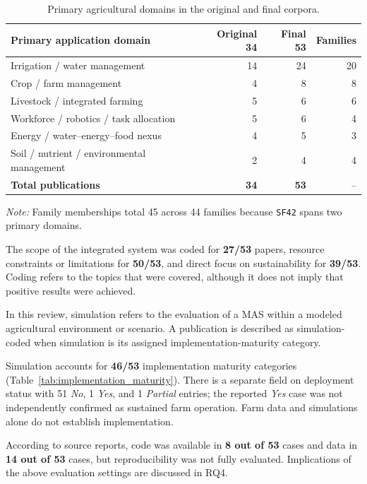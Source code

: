 \documentclass[11pt,a4paper]{article}
\begin{document}
\begin{table}[H]
\centering
\small
\caption{Primary agricultural domains in the original and final corpora.}
\label{tab:application_domains}
\begin{tabularx}{\textwidth}{@{}Xrrr@{}}
\toprule
\textbf{Primary application domain} &
\textbf{Original 34} &
\textbf{Final 53} &
\textbf{Families} \\
\midrule
Irrigation / water management & 14 & 24 & 20 \\
Crop / farm management & 4 & 8 & 8 \\
Livestock / integrated farming & 5 & 6 & 6 \\
Workforce / robotics / task allocation & 5 & 6 & 4 \\
Energy / water--energy--food nexus & 4 & 5 & 3 \\
Soil / nutrient / environmental management & 2 & 4 & 4 \\
\midrule
\textbf{Total publications} & \textbf{34} & \textbf{53} & -- \\
\bottomrule
\end{tabularx}
\par\smallskip
\footnotesize\emph{Note:} Family memberships total 45 across 44
families because \texttt{SF42} spans two primary domains.
\end{table}

The scope of the integrated system was coded for \textbf{27/53} papers, resource constraints or limitations for \textbf{50/53}, and direct focus on sustainability for \textbf{39/53}. Coding refers to the topics that were covered, although it does not imply that positive results were achieved. 

In this review, simulation refers to the evaluation of a MAS within a modeled agricultural environment or scenario. A publication is described as simulation-coded when simulation is its assigned implementation-maturity category.


Simulation accounts for \textbf{46/53} implementation maturity categories (Table~\ref{tab:implementation_maturity}). There is a separate field on deployment status with 51 \emph{No}, 1 \emph{Yes}, and 1 \emph{Partial} entries; the reported \emph{Yes} case was not independently confirmed as sustained farm operation. Farm data and simulations alone do not establish implementation.

According to source reports, code was available in \textbf{8 out of 53}
cases and data in \textbf{14 out of 53} cases, but reproducibility was
not fully evaluated. Implications of the above evaluation settings are
discussed in RQ4.
\end{document}
